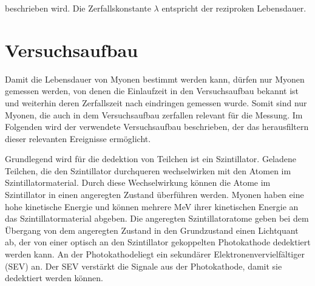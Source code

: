 beschrieben wird. Die Zerfallskonstante $\lambda$ entspricht der reziproken
Lebensdauer.





\section{Versuchsaufbau}

Damit die Lebensdauer von Myonen bestimmt werden kann, dürfen nur
Myonen gemessen werden, von denen die Einlaufzeit in den Versuchsaufbau bekannt ist
und weiterhin deren Zerfallszeit nach eindringen gemessen wurde.
Somit sind nur Myonen, die auch in dem Versuchsaufbau zerfallen relevant
für die Messung. Im Folgenden wird der verwendete Versuchsaufbau beschrieben,
der das herausfiltern dieser relevanten Ereignisse ermöglicht.

Grundlegend wird für die dedektion von Teilchen ist ein Szintillator.
Geladene Teilchen, die den Szintillator durchqueren wechselwirken mit den Atomen
im Szintillatormaterial. Durch diese Wechselwirkung können
die Atome im Szintillator in einen angeregten Zustand überführen werden.
Myonen haben eine hohe kinetische Energie und können mehrere MeV ihrer kinetischen Energie
an das Szintillatormaterial abgeben. Die angeregten Szintillatoratome geben
bei dem Übergang von dem angeregten Zustand in den Grundzustand einen Lichtquant
ab, der von einer optisch an den Szintillator gekoppelten Photokathode
dedektiert werden kann.
An der Photokathodeliegt ein sekundärer Elektronenvervielfältiger (SEV) an.
Der SEV verstärkt die Signale aus der Photokathode, damit sie dedektiert werden
können.

